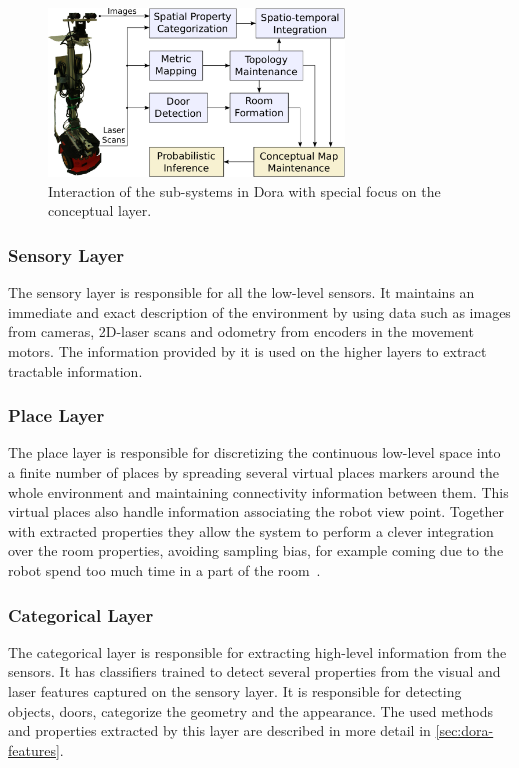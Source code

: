 \begin{figure}[h]
\centering
\includegraphics[width=0.7\textwidth]{figures/dora-architecture.pdf}
\caption{\label{fig:dora-architecture}Interaction of the sub-systems
         in Dora with special focus on the conceptual layer.}
\end{figure}

\subsubsection*{Sensory Layer}
The sensory layer is responsible for all the low-level sensors.
It maintains an immediate and exact description of the environment by using
data such as images from cameras, 2D\hyp{}laser scans and odometry from encoders in the
movement motors. The information provided by it is used on the higher layers to extract
tractable information.

\subsubsection*{Place Layer}
The place layer is responsible for discretizing the continuous low-level space into
a finite number of places by spreading several virtual places markers around the whole
environment and maintaining connectivity information between them.
This virtual places also handle information associating the robot view point. Together
with extracted properties they allow the system to perform a clever integration over the
room properties, avoiding sampling bias, for example coming due to the robot spend too
much time in a part of the room~\cite{pronobis2010ijrr}.

\subsubsection*{Categorical Layer}
The categorical layer is responsible for extracting high-level information from the
sensors. It has classifiers trained to detect several properties from the visual and laser
features captured on the sensory layer.
It is responsible for detecting objects, doors, categorize the geometry and the appearance.
The used methods and properties extracted by this layer are described in more detail in
\autoref{sec:dora-features}.

